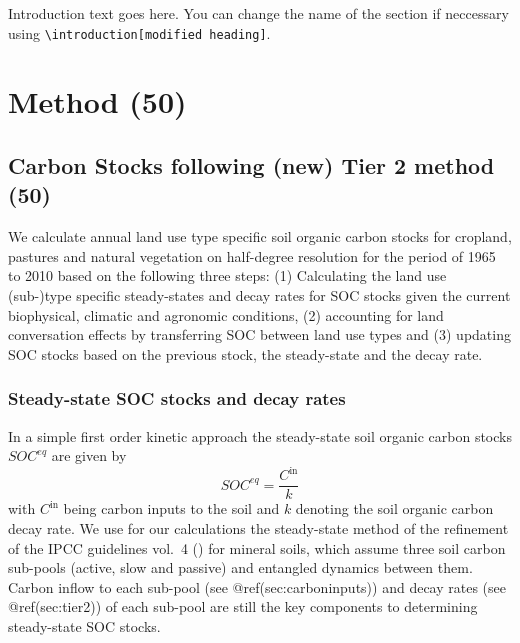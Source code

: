 \documentclass[gc, manuscript]{copernicus}
\begin{document}


\newpage

\introduction

Introduction text goes here. You can change the name of the section if
neccessary using
\texttt{\textbackslash{}introduction{[}modified\ heading{]}}. \newpage

\section{Method (50)}

\hypertarget{sec:carbonbudget}{%
\subsection{Carbon Stocks following (new) Tier 2 method
(50)}\label{sec:carbonbudget}}

We calculate annual land use type specific soil organic carbon stocks
for cropland, pastures and natural vegetation on half-degree resolution
for the period of 1965 to 2010 based on the following three steps: (1)
Calculating the land use (sub-)type specific steady-states and decay
rates for SOC stocks given the current biophysical, climatic and
agronomic conditions, (2) accounting for land conversation effects by
transferring SOC between land use types and (3) updating SOC stocks
based on the previous stock, the steady-state and the decay rate.

\subsubsection{Steady-state SOC stocks and decay rates}

In a simple first order kinetic approach the steady-state soil organic
carbon stocks \(SOC^{eq}\) are given by \begin{equation}
SOC^{eq} =\frac{C^{\textrm{in}}}{k}
\label{eq:inoutflow}
\end{equation} with \(C^{\textrm{in}}\) being carbon inputs to the soil
and \(k\) denoting the soil organic carbon decay rate. We use for our
calculations the steady-state method of the refinement of the IPCC
guidelines vol.~4 (\citet{ipcc_2019_2019}) for mineral soils, which
assume three soil carbon sub-pools (active, slow and passive) and
entangled dynamics between them. Carbon inflow to each sub-pool (see
@ref(sec:carboninputs)) and decay rates (see @ref(sec:tier2)) of each
sub-pool are still the key components to determining steady-state SOC
stocks.
\end{document}
